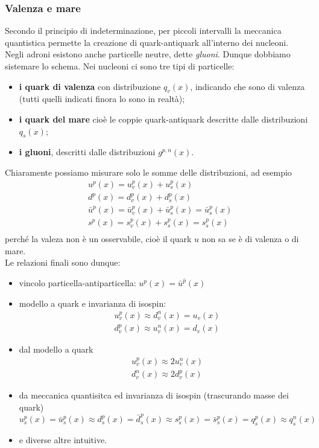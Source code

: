 \subsubsection{Valenza e mare}
Secondo il principio di indeterminazione, per piccoli intervalli la meccanica quantistica permette la creazione di quark-antiquark all'interno dei nucleoni. Negli adroni esistono anche particelle neutre, dette \textit{gluoni}. Dunque dobbiamo sistemare lo schema. Nei nucleoni ci sono tre tipi di particelle:
\begin{itemize}
    \item \textbf{i quark di valenza} con distribuzione $q_v(x)$, indicando che sono di valenza (tutti quelli indicati finora lo sono in realtà);
    \item \textbf{i quark del mare} cioè le coppie quark-antiquark descritte dalle distribuzioni $q_s(x)$;
    \item \textbf{i gluoni}, descritti dalle distribuzioni $g^{p,n}(x)$.
\end{itemize}
Chiaramente possiamo misurare solo le somme delle distribuzioni, ad esempio 
\begin{align*}
&u^p(x)=u^p_v(x)+u^p_s(x)\\
&d^p(x)=d^p_v(x)+d^p_s(x)\\
&\bar u^p(x)=\bar u^p_v(x)+\bar u^p_s(x)=\bar u^p_s(x)\\
&s^p(x)=s^p_v(x)+s^p_s(x)=s^p_s(x)\\
\end{align*}
perché la valeza non è un osservabile, cioè il quark $u$ non sa se è di valenza o di mare.\\
Le relazioni finali sono dunque:
\begin{itemize}
    \item vincolo particella-antiparticella: $u^p(x)=\bar u^{\bar p}(x)$
    \item modello a quark e invarianza di isospin:
    \begin{align*}
    &u^p_v(x)\approx d^n_v(x)=u_v(x)\\
    &d^p_v(x)\approx u^n_v(x)=d_v(x)
    \end{align*}
    \item dal modello a quark
    \begin{align*}
        &u^p_v(x)\approx 2u^n_v(x)\\
        &d^n_v(x)\approx 2d^p_v(x)
    \end{align*}
    \item da meccanica quantisitca ed invarianza di isospin (trascurando masse dei quark)
    \begin{equation*}
    u^p_s(x)=\bar u^p_s(x)\approx d^p_s(x)=\bar d^p_s(x)\approx s_s^p(x)=\bar s^p_s(x)=q^p_s(x)\approx q_s^n(x)
    \end{equation*}
    \item e diverse altre intuitive.
\end{itemize}
